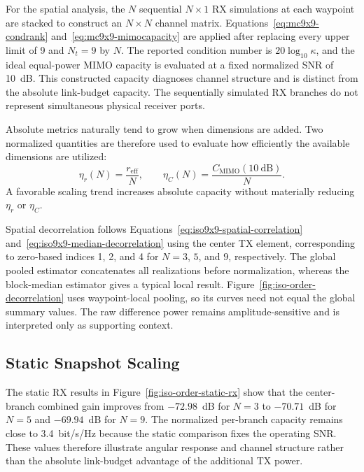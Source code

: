 For the spatial analysis, the $N$ sequential $N\times1$ RX simulations at each waypoint are stacked to construct an $N\times N$ channel matrix. Equations~\ref{eq:mc9x9-condrank} and~\ref{eq:mc9x9-mimocapacity} are applied after replacing every upper limit of 9 and $N_t=9$ by $N$. The reported condition number is $20\log_{10}\kappa$, and the ideal equal-power MIMO capacity is evaluated at a fixed normalized SNR of 10~dB. This constructed capacity diagnoses channel structure and is distinct from the absolute link-budget capacity. The sequentially simulated RX branches do not represent simultaneous physical receiver ports.

Absolute metrics naturally tend to grow when dimensions are added. Two normalized quantities are therefore used to evaluate how efficiently the available dimensions are utilized:
\begin{equation}
    \eta_r(N)=\frac{r_\mathrm{eff}}{N},
    \qquad
    \eta_C(N)=\frac{C_\mathrm{MIMO}(10~\mathrm{dB})}{N}.
    \label{eq:iso-order-normalized-metrics}
\end{equation}
A favorable scaling trend increases absolute capacity without materially reducing $\eta_r$ or $\eta_C$.

Spatial decorrelation follows Equations~\ref{eq:iso9x9-spatial-correlation} and~\ref{eq:iso9x9-median-decorrelation} using the center TX element, corresponding to zero-based indices 1, 2, and 4 for $N=3$, $5$, and $9$, respectively. The global pooled estimator concatenates all realizations before normalization, whereas the block-median estimator gives a typical local result. Figure~\ref{fig:iso-order-decorrelation} uses waypoint-local pooling, so its curves need not equal the global summary values. The raw difference power remains amplitude-sensitive and is interpreted only as supporting context.

\subsection{Static Snapshot Scaling}

The static RX results in Figure~\ref{fig:iso-order-static-rx} show that the center-branch combined gain improves from $-72.98$~dB for $N=3$ to $-70.71$~dB for $N=5$ and $-69.94$~dB for $N=9$. The normalized per-branch capacity remains close to 3.4~bit/s/Hz because the static comparison fixes the operating SNR. These values therefore illustrate angular response and channel structure rather than the absolute link-budget advantage of the additional TX power.

